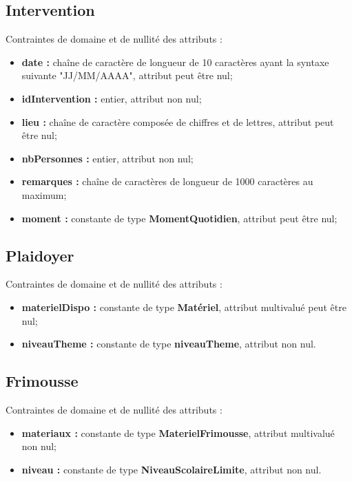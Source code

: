 \documentclass[asi, sansVersion]{picInsa}
\begin{document}
\subsection*{Intervention} 
Contraintes de domaine et de nullité des attributs :
\begin{itemize}
	\item \textbf{date :} chaîne de caractère de longueur de 10 caractères ayant la syntaxe suivante "JJ/MM/AAAA", attribut peut être nul;
 	\item \textbf{idIntervention :} entier, attribut non nul;
	\item \textbf{lieu :} chaîne de caractère composée de chiffres et de lettres, attribut peut être nul;
	\item \textbf{nbPersonnes :} entier, attribut non nul;  
	\item \textbf{remarques :} chaîne de caractères de longueur de 1000 caractères au maximum;
	\item \textbf{moment :} constante de type \textbf{MomentQuotidien}, attribut peut être nul;\\
\end{itemize}  

\subsection*{Plaidoyer}
Contraintes de domaine et de nullité des attributs :
\begin{itemize}
	\item \textbf{materielDispo :} constante de type \textbf{Matériel}, attribut multivalué peut être nul; 
	\item \textbf{niveauTheme :} constante de type \textbf{niveauTheme}, attribut non nul.\\
\end{itemize}

\subsection*{Frimousse}
Contraintes de domaine et de nullité des attributs :
\begin{itemize}
	\item \textbf{materiaux :} constante de type \textbf{MaterielFrimousse}, attribut multivalué non nul;
	\item \textbf{niveau :} constante de type \textbf{NiveauScolaireLimite}, attribut non nul.\\
\end{itemize}
\end{document}
